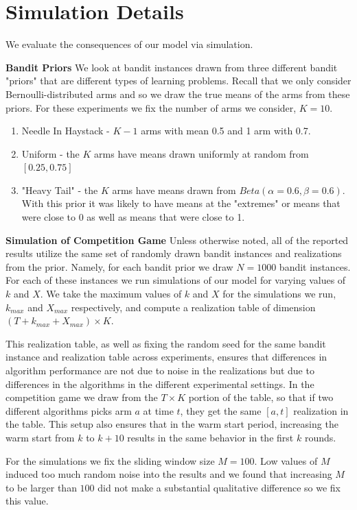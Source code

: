 \documentclass[letterpaper]{article}
\theoremstyle{definition}
\begin{document}
\section{Simulation Details}\label{section:3}

We evaluate the consequences of our model via simulation.

\textbf{Bandit Priors} We look at bandit instances drawn from three different bandit "priors" that are different types of learning problems. Recall that we only consider Bernoulli-distributed arms and so we draw the true means of the arms from these priors. For these experiments we fix the number of arms we consider, $K = 10$.
\begin{enumerate}
\item Needle In Haystack - $K-1$ arms with mean 0.5 and 1 arm with 0.7.
\item Uniform - the $K$ arms have means drawn uniformly at random from $[0.25, 0.75]$
\item "Heavy Tail" - the $K$ arms have means drawn from $Beta(\alpha=0.6, \beta = 0.6)$. With this prior it was likely to have means at the "extremes" or means that were close to 0 as well as means that were close to 1.
\end{enumerate}

\noindent \textbf{Simulation of Competition Game} Unless otherwise noted, all of the reported results utilize the same set of randomly drawn bandit instances and realizations from the prior. Namely, for each bandit prior we draw $N = 1000$ bandit instances. For each of these instances we run simulations of our model for varying values of $k$ and $X$. We take the maximum values of $k$ and $X$ for the simulations we run, $k_{max}$ and $X_{max}$ respectively, and compute a realization table of dimension $(T+k_{max}+X_{max}) \times K$.

This realization table, as well as fixing the random seed for the same bandit instance and realization table across experiments, ensures that differences in algorithm performance are not due to noise in the realizations but due to differences in the algorithms in the different experimental settings. In the competition game we draw from the $T \times K$ portion of the table, so that if two different algorithms picks arm $a$ at time $t$, they get the same $[a, t]$ realization in the table. This setup also ensures that in the warm start period, increasing the warm start from $k$ to $k + 10$ results in the same behavior in the first $k$ rounds.

For the simulations we fix the sliding window size $M = 100$. Low values of $M$ induced too much random noise into the results and we found that increasing $M$ to be larger than $100$ did not make a substantial qualitative difference so we fix this value.
\end{document}
